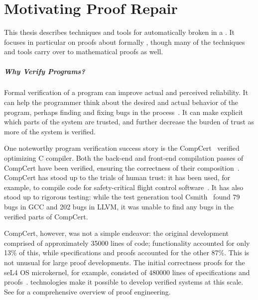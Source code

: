 \chapter{Motivating Proof Repair}
\label{chapt:mot}

This thesis describes techniques and tools for automatically  broken  in a .
It focuses in particular on proofs about formally  , though many of the techniques and tools carry over to mathematical proofs as well.

\paragraph{Why Verify Programs?}

Formal verification of a program can improve actual and perceived reliability.
It can help the programmer think about the desired and actual behavior of the program,
perhaps finding and fixing bugs in the process~\cite{murraybp}.
It can make explicit which parts of the system are trusted, and further decrease the burden
of trust as more of the system is verified.

One noteworthy program verification success story is the CompCert~\cite{Leroy:POPL06, Leroy2009} verified optimizing C compiler.
Both the back-end and front-end compilation passes
of CompCert have been verified, ensuring the correctness of their composition~\cite{Kaestner2017}.
CompCert has stood up to the trials of human trust: it has been used, for example, to compile code for safety-critical flight control software~\cite{Frana2011}.
It has also stood up to rigorous testing: while the test generation tool Csmith~\cite{Yang2011} found 
79 bugs in GCC and 202 bugs in LLVM, it was unable to find any bugs in the verified parts of CompCert.

CompCert, however, was not a simple endeavor: the original development comprised of approximately 35000 lines of code;
functionality accounted for only 13\% of this, while specifications and proofs accounted for the other 87\%.
This is not unusual for large proof developments. The initial correctness proofs for the seL4 OS microkernel,
for example, consisted of 480000 lines of specifications and proofs~\cite{Klein2014micro}.
 technologies make it possible to develop verified systems at this scale.
See  for a comprehensive overview of proof engineering.

